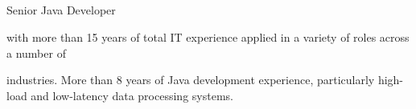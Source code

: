 \documentclass{res}
\newcommand{\osection}[1]{\section{\sc {\Large \textbf{#1}\\}} \vspace{0.30cm}}
\newif\ifFullVersion
\begin{document}
\begin{resume}

\osection{Summary}
\vspace{-0.20cm}
\ifFullVersion
\noindent Team Lead / Principal Software Developer
\else
\noindent Senior Java Developer
\fi
with more than 15 years of total IT experience applied in a variety of roles across a number of
\ifFullVersion
 industries: Finance, Web Security, Oil~\&~Gas, Utilities, Public Safety and Banking. Strong engineering background, working knowledge and proven skills in all stages of the software development lifecycle. More than 5~years of team leading experience, ability to interact well at all levels and articulate the IT-specific issues to non-IT colleagues in a clear business-transparent way.\\
\indent Looking for a challenging role where my skills and qualifications will add value and make a significant contribution to the company.
\else
industries. More than 8 years of Java development experience, particularly high-load and low-latency data processing systems.
\fi


\end{resume}
\end{document}
